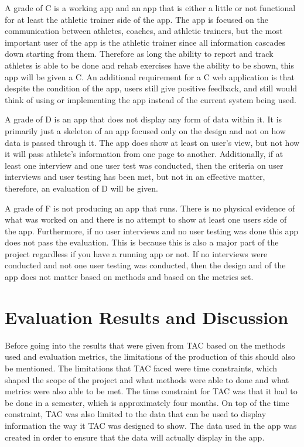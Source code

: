 \documentclass[10pt,twocolumn]{article}
\begin{document}
A grade of C is a working app and an app that is either a little or not functional for at least the athletic trainer side of the app. The app is focused on the communication between athletes, coaches, and athletic trainers, but the most important user of the app is the athletic trainer since all information cascades down starting from them. Therefore as long the ability to report and track athletes is able to be done and rehab exercises have the ability to be shown, this app will be given a C. An additional requirement for a C web application is that despite the condition of the app, users still give positive feedback, and still would think of using or implementing the app instead of the current system being used.

A grade of D is an app that does not display any form of data within it. It is primarily just a skeleton of an app focused only on the design and not on how data is passed through it. The app does show at least on user's view, but not how it will pass athlete's information from one page to another. Additionally, if at least one interview and one user test was conducted, then the criteria on user interviews and user testing has been met, but not in an effective matter, therefore, an evaluation of D will be given.

A grade of F is not producing an app that runs. There is no physical evidence of what was worked on and there is no attempt to show at least one users side of the app. Furthermore, if no user interviews and no user testing was done this app does not pass the evaluation. This is because this is also a major part of the project regardless if you have a running app or not. If no interviews were conducted and not one user testing was conducted, then the design and of the app does not matter based on methods and based on the metrics set.



\section{Evaluation Results and Discussion}
Before going into the results that were given from TAC based on the methods used and evaluation metrics, the limitations of the production of this should also be mentioned. The limitations that TAC faced were time constraints, which shaped the scope of the project and what methods were able to done and what metrics were also able to be met. The time constraint for TAC was that it had to be done in a semester, which is approximately four months. On top of the time constraint, TAC was also limited to the data that can be used to display information the way it TAC was designed to show. The data used in the app was created in order to ensure that the data will actually display in the app.
\end{document}
